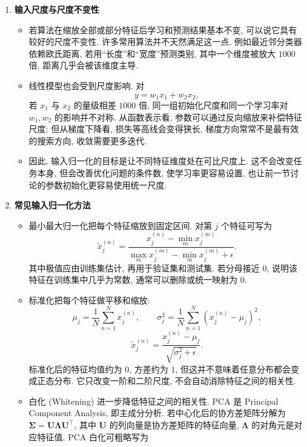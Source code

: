 \documentclass{../nndlcourse}
\begin{document}
\begin{enumerate}
\begin{itemize}
      \item 需要注意, 残差连接改变的是网络架构, 不是 loss 本身. 它让优化地形更友好, 但仍需要配合合适初始化、归一化和学习率.
    \end{itemize}
  \item \textbf{输入尺度与尺度不变性}
    \begin{itemize}
      \item 若算法在缩放全部或部分特征后学习和预测结果基本不变, 可以说它具有较好的尺度不变性. 许多常用算法并不天然满足这一点. 例如最近邻分类器依赖欧氏距离, 若用“长度”和“宽度”预测类别, 其中一个维度被放大 $1000$ 倍, 距离几乎会被该维度主导.
      \item 线性模型也会受到尺度影响. 对
      \[
        y=w_1x_1+w_2x_2,
      \]
      若 $x_1$ 与 $x_2$ 的量级相差 $1000$ 倍, 同一组初始化尺度和同一个学习率对 $w_1,w_2$ 的影响并不对称. 从函数表示看, 参数可以通过反向缩放来补偿特征尺度; 但从梯度下降看, 损失等高线会变得狭长, 梯度方向常常不是最有效的搜索方向, 收敛需要更多迭代.
      \item 因此, 输入归一化的目标是让不同特征维度处在可比尺度上. 这不会改变任务本身, 但会改善优化问题的条件数, 使学习率更容易设置, 也让前一节讨论的参数初始化更容易使用统一尺度.
    \end{itemize}
  \item \textbf{常见输入归一化方法}
    \begin{itemize}
      \item 最小最大归一化把每个特征缩放到固定区间. 对第 $j$ 个特征可写为
      \[
        \tilde{x}_j^{(n)}
        =
        \frac{x_j^{(n)}-\min_m x_j^{(m)}}
        {\max_m x_j^{(m)}-\min_m x_j^{(m)}+\epsilon}.
      \]
      其中极值应由训练集估计, 再用于验证集和测试集. 若分母接近 $0$, 说明该特征在训练集中几乎为常数, 通常可以删除或统一映射为 $0$.
      \item 标准化把每个特征做平移和缩放:
      \[
        \mu_j=\frac{1}{N}\sum_{n=1}^{N}x_j^{(n)},
        \qquad
        \sigma_j^2
        =
        \frac{1}{N}\sum_{n=1}^{N}
        {\left(x_j^{(n)}-\mu_j\right)}^2,
      \]
      \[
        \tilde{x}_j^{(n)}
        =
        \frac{x_j^{(n)}-\mu_j}{\sqrt{\sigma_j^2+\epsilon}}.
      \]
      标准化后的特征均值约为 $0$, 方差约为 $1$, 但这并不意味着任意分布都会变成正态分布. 它只改变一阶和二阶尺度, 不会自动消除特征之间的相关性.
      \item 白化 (Whitening) 进一步降低特征之间的相关性. PCA 是 Principal Component Analysis, 即主成分分析. 若中心化后的协方差矩阵分解为 $\boldsymbol{\Sigma}=\boldsymbol{U}\boldsymbol{\Lambda}\boldsymbol{U}^{\top}$, 其中 $\boldsymbol{U}$ 的列向量是协方差矩阵的特征向量, $\boldsymbol{\Lambda}$ 的对角元是对应特征值, PCA 白化可粗略写为

\end{itemize}
\end{enumerate}
\end{document}
